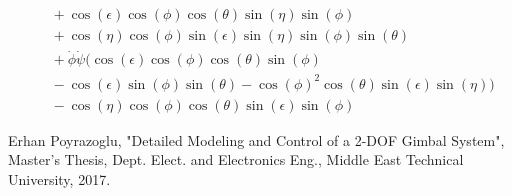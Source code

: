 \documentclass[letterpaper, 10 pt, conference]{ieeeconf}  %
\begin{document}
\begin{equation}
\begin{aligned}
                             & \quad  + \cos(\epsilon)\cos(\phi)\cos(\theta)\sin(\eta)\sin(\phi)                                                       \\
                             & \quad + \cos(\eta)\cos(\phi)\sin(\epsilon)\sin(\eta)\sin(\phi)\sin(\theta)                                              \\
                             & \quad + \dot{\phi}\dot{\psi}(\cos(\epsilon)\cos(\phi)\cos(\theta)\sin(\phi)                                             \\
                             & \quad  - \cos(\epsilon)\sin(\phi)\sin(\theta) - \cos(\phi)^2\cos(\theta)\sin(\epsilon)\sin(\eta))                       \\
                             & \quad - \cos(\eta)\cos(\phi)\cos(\theta)\sin(\epsilon)\sin(\phi)
  \end{aligned}
\end{equation}


\begin{thebibliography}{99}
   Erhan Poyrazoglu, "Detailed Modeling and Control of a 2-DOF Gimbal System", Master's Thesis, Dept. Elect. and Electronics Eng., Middle East Technical University, 2017.
  
  
  
  
  
  
\end{thebibliography}
\end{document}
